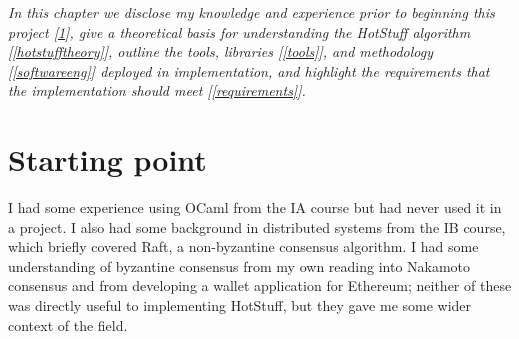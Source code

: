 




\textit{In this chapter we disclose my knowledge and experience prior to beginning this project [\ref{start}], give a theoretical basis for understanding the HotStuff algorithm [\ref{hotstufftheory}], outline the tools, libraries [\ref{tools}], and methodology [\ref{softwareeng}] deployed in implementation, and highlight the requirements that the implementation should meet [\ref{requirements}].}

\section{Starting point} \label{start}
I had some experience using OCaml from the IA course but had never used it in a project. I also had some background in distributed systems from the IB course, which briefly covered Raft, a non-byzantine consensus algorithm. I had some understanding of byzantine consensus from my own reading into Nakamoto consensus and from developing a wallet application for Ethereum; neither of these was directly useful to implementing HotStuff, but they gave me some wider context of the field.

